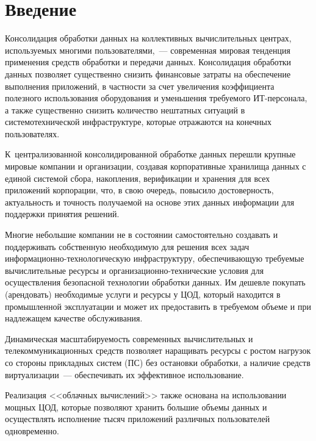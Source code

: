       \begin{multicols}{2}

            \label{st\stat}


\section{Введение}
       
       Консолидация обработки данных на коллективных вычислительных центрах, 
используемых многими пользователями,~--- современная мировая тенденция применения 
средств обработки и передачи данных. Консолидация обработки данных позволяет 
существенно снизить финансовые затраты на обеспечение выполнения приложений, в 
част\-ности за счет увеличения коэффициента полезного использования оборудования и 
уменьшения тре\-бу\-емо\-го ИТ-пер\-со\-на\-ла, а также существенно снизить количество 
нештатных ситуаций в сис\-те\-мо\-тех\-ни\-че\-ской инфраструктуре, которые отражаются на 
конечных пользователях. 

К~централизованной консолидированной обработке данных 
перешли крупные мировые компании и организации, создавая корпоративные хранилища 
данных с единой сис\-те\-мой сбора, накопления, верификации и хранения для всех 
приложений корпорации, что, в свою очередь, повысило достоверность, актуальность и 
точность получаемой на основе этих данных информации для поддержки принятия 
решений. 
       
       Многие небольшие компании не в состоянии самостоятельно создавать и 
поддерживать собственную необходимую для решения всех задач 
ин\-фор\-ма\-ци\-он\-но-технологическую инфраструктуру, обеспечи\-вающую требуемые вычислительные ресурсы 
и организационно-технические условия для осуществления безопасной технологии 
обработки данных. Им дешевле покупать (арендовать) необходимые услуги и ресурсы у 
ЦОД, который находится в промышленной эксплуатации и 
может их предоставить в требуемом объеме и при надлежащем качестве обслуживания.
       
       Динамическая масштабируемость современных вычислительных и 
телекоммуникационных средств позволяет наращивать ресурсы с ростом нагрузок со 
стороны прикладных сис\-тем (ПС) без остановки обработки, а наличие средств 
виртуализации~--- обеспечивать их эффективное использование. 

Реализация <<облачных 
вычислений>> также основана на использовании мощных ЦОД, 
которые позволяют хранить большие объемы данных и осуществлять исполнение тысяч 
приложений различных пользователей одновременно. 
       

\end{multicols}
